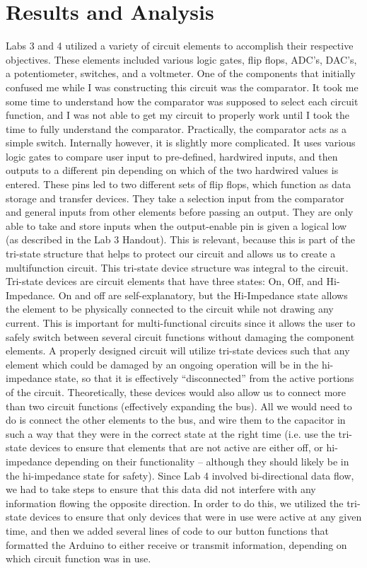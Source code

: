 \documentclass[11pt]{article}
\begin{document}
\section{Results and Analysis}
\label{sec:orgf3f6db4}
Labs 3 and 4 utilized a variety of circuit elements to accomplish their respective objectives. These elements included various logic gates, flip flops, ADC’s, DAC’s, a potentiometer, switches, and a voltmeter. One of the components that initially confused me while I was constructing this circuit was the comparator. It took me some time to understand how the comparator was supposed to select each circuit function, and I was not able to get my circuit to properly work until I took the time to fully understand the comparator. Practically, the comparator acts as a simple switch. Internally however, it is slightly more complicated. It uses various logic gates to compare user input to pre-defined, hardwired inputs, and then outputs to a different pin depending on which of the two hardwired values is entered. These pins led to two different sets of flip flops, which function as data storage and transfer devices. They take a selection input from the comparator and general inputs from other elements before passing an output. They are only able to take and store inputs when the output-enable pin is given a logical low (as described in the Lab 3 Handout). This is relevant, because this is part of the tri-state structure that helps to protect our circuit and allows us to create a multifunction circuit. This tri-state device structure was integral to the circuit. Tri-state devices are circuit elements that have three states: On, Off, and Hi-Impedance. On and off are self-explanatory, but the Hi-Impedance state allows the element to be physically connected to the circuit while not drawing any current. This is important for multi-functional circuits since it allows the user to safely switch between several circuit functions without damaging the component elements. A properly designed circuit will utilize tri-state devices such that any element which could be damaged by an ongoing operation will be in the hi-impedance state, so that it is effectively “disconnected” from the active portions of the circuit. Theoretically, these devices would also allow us to connect more than two circuit functions (effectively expanding the bus). All we would need to do is connect the other elements to the bus, and wire them to the capacitor in such a way that they were in the correct state at the right time (i.e. use the tri-state devices to ensure that elements that are not active are either off, or hi-impedance depending on their functionality – although they should likely be in the hi-impedance state for safety). Since Lab 4 involved bi-directional data flow, we had to take steps to ensure that this data did not interfere with any information flowing the opposite direction. In order to do this, we utilized the tri-state devices to ensure that only devices that were in use were active at any given time, and then we added several lines of code to our button functions that formatted the Arduino to either receive or transmit information, depending on which circuit function was in use. 
\end{document}
